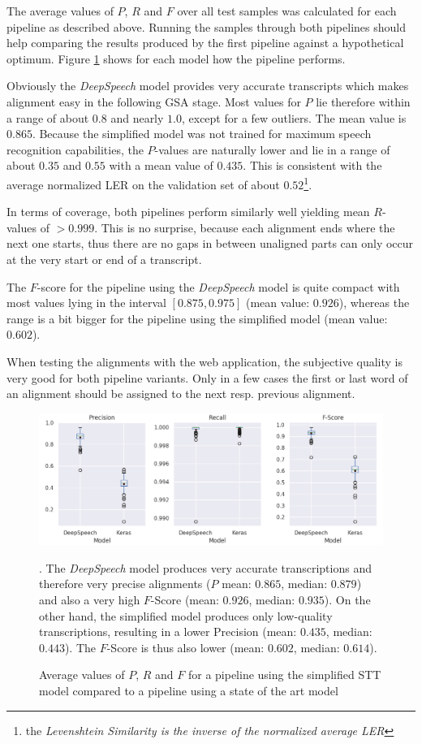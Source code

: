 The average values of $P$, $R$ and $F$ over all test samples was calculated for each pipeline as described above. Running the samples through both pipelines should help comparing the results produced by the first pipeline against a hypothetical optimum. Figure \ref{pipeline_boxplot_ls_en} shows for each model how the pipeline performs. 

Obviously the \textit{DeepSpeech} model provides very accurate transcripts which makes alignment easy in the following \ac{GSA} stage. Most values for $P$ lie therefore within a range of about $0.8$ and nearly $1.0$, except for a few outliers. The mean value is $0.865$. Because the simplified model was not trained for maximum speech recognition capabilities, the $P$-values are naturally lower and lie in a range of about $0.35$ and $0.55$ with a mean value of $0.435$. This is consistent with the average normalized \ac{LER} on the validation set of about $0.52$\footnote{the \textit{Levenshtein Similarity is the inverse of the normalized average \ac{LER}}}. 

In terms of coverage, both pipelines perform similarly well yielding mean $R$-values of $>0.999$. This is no surprise, because each alignment ends where the next one starts, thus there are no gaps in between unaligned parts can only occur at the very start or end of a transcript. 

The $F$-score for the pipeline using the \textit{DeepSpeech} model is quite compact with most values lying in the interval $[0.875, 0.975]$ (mean value: $0.926$), whereas the range is a bit bigger for the pipeline using the simplified model (mean value: $0.602$).

When testing the alignments with the web application, the subjective quality is very good for both pipeline variants. Only in a few cases the first or last word of an alignment should be assigned to the next resp. previous alignment.

\begin{figure}[h!]
	\includegraphics[width=\linewidth]{./img/boxplot_ls.png}
	\caption{Average values of $P$, $R$ and $F$ for a pipeline using the simplified \ac{STT} model compared to a pipeline using a state of the art model}. The \textit{DeepSpeech} model produces very accurate transcriptions and therefore very precise alignments ($P$ mean: $0.865$, median: $0.879$) and also a very high $F$-Score (mean: $0.926$, median: $0.935$). On the other hand, the simplified model produces only low-quality transcriptions, resulting in a lower Precision (mean: $0.435$, median: $0.443$). The $F$-Score is thus also lower (mean: $0.602$, median: $0.614$).
	\label{pipeline_boxplot_ls_en}
\end{figure}

